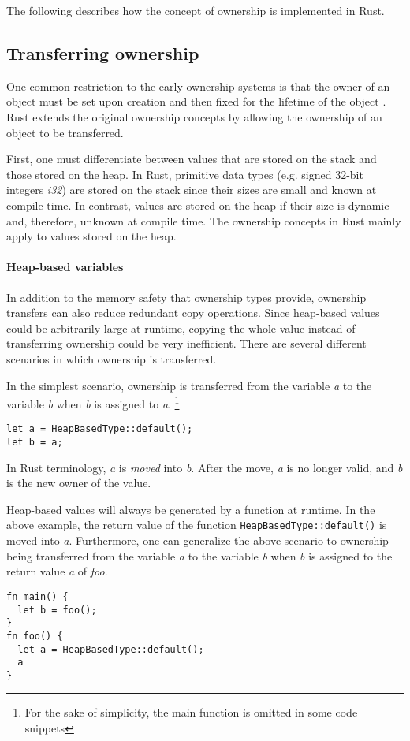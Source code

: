 \documentclass[sigplan,11pt,nonacm]{acmart}
\begin{document}
The following describes how the concept of ownership is implemented in Rust.


\subsection{Transferring ownership}
\label{sec:rust-transferring-ownership}

One common restriction to the early ownership systems is that the owner of an object must be set upon creation and then fixed for the lifetime of the object \cite{ownership-types-survey}.
Rust extends the original ownership concepts by allowing the ownership of an object to be transferred.

First, one must differentiate between values that are stored on the stack and those stored on the heap.
In Rust, primitive data types (e.g. signed 32-bit integers \emph{i32}) are stored on the stack since their sizes are small and known at compile time.
In contrast, values are stored on the heap if their size is dynamic and, therefore, unknown at compile time.
The ownership concepts in Rust mainly apply to values stored on the heap.

\paragraph{Heap-based variables}

In addition to the memory safety that ownership types provide, ownership transfers can also reduce redundant copy operations.
Since heap-based values could be arbitrarily large at runtime, copying the whole value instead of transferring ownership could be very inefficient.
There are several different scenarios in which ownership is transferred.

In the simplest scenario, ownership is transferred from the variable \emph{a} to the variable \emph{b} when \emph{b} is assigned to \emph{a}.
\footnote{For the sake of simplicity, the main function is omitted in some code snippets}

\begin{lstlisting}
let a = HeapBasedType::default();
let b = a;
\end{lstlisting}
In Rust terminology, \emph{a} is \emph{moved} into \emph{b}.
After the move, \emph{a} is no longer valid, and \emph{b} is the new owner of the value.

Heap-based values will always be generated by a function at runtime.
In the above example, the return value of the function \verb|HeapBasedType::default()| is moved into \emph{a}.
Furthermore, one can generalize the above scenario to ownership being transferred from the variable \emph{a} to the variable \emph{b} when \emph{b} is assigned to the return value \emph{a} of \emph{foo}.
\begin{lstlisting}
fn main() {
  let b = foo();
}
fn foo() {
  let a = HeapBasedType::default();
  a
}
\end{lstlisting}
\end{document}
